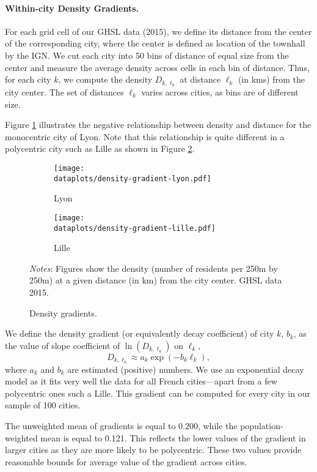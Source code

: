 \documentclass[11pt]{report}
\newcommand{\dataplots}{../../output/data/plots}
\begin{document}
\paragraph{Within-city Density Gradients.} For each grid cell of our GHSL data (2015), we define its distance from the center of the corresponding city, where the center is defined as location of the townhall by the IGN. We cut each city into 50 bins of distance of equal size from the center and measure the average density across cells in each bin of distance. Thus, for each city $k$, we compute the density $D_{k,\ell_k}$ at distance $\ell_k$ (in kms) from the city center. The set of distances $\ell_k$ varies across cities, as bins are of different size.

Figure \ref{A-fig:gradientlyon} illustrates the negative relationship between density and distance for the monocentric city of Lyon. Note that this relationship is quite different in a polycentric city such as Lille as shown in Figure \ref{A-fig:gradientlille}. 

\begin{figure}[h]
	\begin{subfigure}{0.5\textwidth}
		\texttt{[image: \\dataplots/density-gradient-lyon.pdf]}
		\caption{Lyon\label{A-fig:gradientlyon}}
	\end{subfigure}%
	\begin{subfigure}{0.5\textwidth}
		\texttt{[image: \\dataplots/density-gradient-lille.pdf]}
		\caption{Lille\label{A-fig:gradientlille}}
	\end{subfigure}
	\caption{Density gradients.\label{A-fig:gradient}}
	{\footnotesize \textit{Notes}: Figures show the density (number of residents per 250m by 250m) at a given distance (in km) from the city center. GHSL data 2015.}
\end{figure}

We define the density gradient (or equivalently decay coefficient) of city $k$, $b_k$, as the value of slope coefficient of $\ln(D_{k,\ell_k})$ on $\ell_k$,	
\begin{equation}
D_{k,\ell_k}\approx a_k\exp(-b_k\ell_k), \label{A-eq:gradient}
\end{equation}
where $a_k$ and $b_k$ are estimated (positive) numbers. We use an exponential decay model as it fits very well the data for all French cities---apart from a few polycentric ones such a Lille. This gradient can be computed for every city in our sample of 100 cities. 

The unweighted mean of gradients is equal to 0.200, while the population-weighted mean is equal to 0.121. This reflects the lower values of the gradient in larger cities as they are more likely to be polycentric. These two values provide reasonable bounds for average value of the gradient across cities. 
\end{document}

